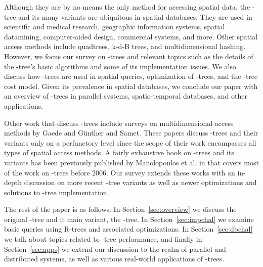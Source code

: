 Although they are by no means the only method for accessing spatial data, the \rbase-tree and 
its many variants are ubiquitous in spatial databases. They are 
used in scientific and medical research, geographic information systems, spatial datamining, 
computer-aided design, commercial systems, and more. Other spatial access methods include 
quadtrees, k-d-B trees, and multidimensional hashing\cite{samet95, gaedegunther98}.
However, we focus our survey on \rbase-trees and relevant topics such as the details of 
the \rbase-tree's basic algorithms and some of its implementation issues. We also discuss 
how \rbase-trees are used in spatial queries, optimization of \rbase-trees, and the 
\rbase-tree cost model. Given its prevalence in spatial databases, we conclude our paper with 
an overview of \rbase-trees in parallel systems, spatio-temporal databases, and other applications. 

Other work that discuss \rbase-trees include surveys on multidimensional access methods
by Gaede and G\"{u}nther \cite{gaedegunther98} and Samet\cite{samet95}. These papers
discuss \rbase-trees and their variants only on a perfunctory level since the scope of their 
work encompasses all types of spatial access methods. A fairly exhaustive book on 
\rbase-trees and its variants has been previously published by Manolopoulos et al.
in \cite{thebook} that covers most of the work on \rbase-trees before 2006. Our survey 
extends these works with an in-depth discussion on more recent \rbase-tree variants as 
well as newer optimizations and solutions to \rbase-tree implementation.

The rest of the paper is as follows. In Section~\ref{sec:overview} we discuss the
original \rbase-tree and it main variant, the \rstar-tree. In Section~\ref{sec:impchal}
we examine basic queries using R-trees and associated optimizations. In 
Section~\ref{sec:dbchal} we talk about topics related to \rbase-tree performance, and 
finally in Section~\ref{sec:apps} we extend our discussion to the realm of parallel and
distributed systems, as well as various real-world applications of \rbase-trees.


